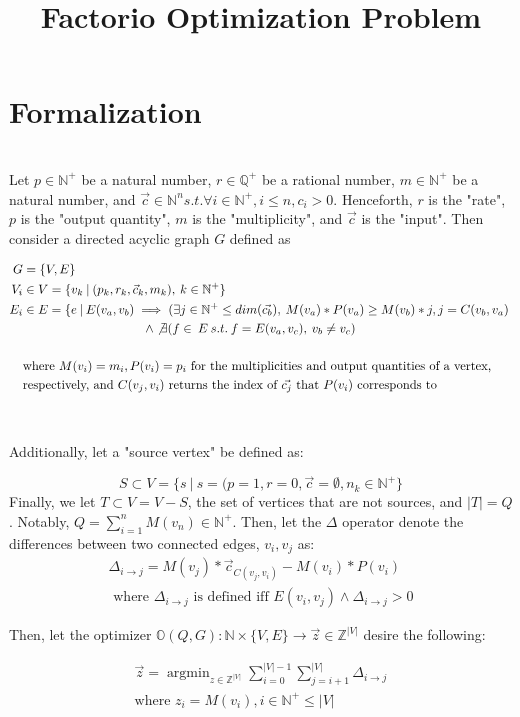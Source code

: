 \documentclass{article}
\title{Factorio Optimization Problem}
\DeclareMathOperator*{\argmin}{argmin}
\begin{document}
\maketitle

\section{Formalization}
\\
\indent Let $p \in \mathbb{N}^+$ be a natural number, $r \in \mathbb{Q}^+$ be a rational number, $m \in \mathbb{N}^+$ be a natural number, and $\vec{c} \in \mathbb{N}^n s.t. \forall i \in \mathbb{N}^+, i \leq n, c_i > 0 $. Henceforth, $r$ is the "rate", $p$ is the "output quantity", $m$ is the "multiplicity", and $\vec{c}$ is the "input". Then consider a directed acyclic graph $G$ defined as

\begin{align*}
G &=  \{V, E\}\\
 V_i &\in V = \{v_k \: | \: (p_k, r_k, \vec{c}_k, m_k), \: k \in \mathbb{N}^+\}\\
 E_i &\in E = \{e \: | \: E(v_a, v_b) \implies (\exists j \in \mathbb{N}^+ \leq dim(\vec{c_b}),\:  M(v_a)*P(v_a) \geq M(v_b) * j, j = C(v_b, v_a)\: \\
 & \hspace{1.355in}\land \not \exists (f \in \:E \: s.t.\: f = E(v_a, v_c), \: v_b \neq v_c)\\
 & \hspace{1.355in}\\
 &\text{where } M(v_i) = m_i, P(v_i) = p_i \text{ for the multiplicities and output quantities of a vertex,}\\
 & \text{respectively, and } C(v_j, v_i) \text{ returns the index of } \vec{c_j} \text{ that } P(v_i) \text{ corresponds to}
\end{align*}

\\\medskip

Additionally, let a "source vertex" be defined as:

\[
S \subset V = \{s \: | \: s = (p=1, r = 0, \vec{c} = \emptyset, n_k \in \mathbb{N}^+\}
\]
\medskip
Finally, we let $T \subset V = V - S$, the set of vertices that are not sources, and $|T| = Q$. Notably, $Q = \sum\limits_{i=1}^n M(v_n) \in \mathbb{N}^+$. Then, let the $\Delta$ operator denote the differences between two connected edges, $v_i, v_j$ as:
\begin{align*}
\Delta_{i\rightarrow j} = M(v_j)*\vec{c}_{C(v_j, v_i)} - M(v_i)*P(v_i) \\
\text{ where } \Delta_{i \rightarrow j} \text{ is defined iff } E(v_i, v_j) \land \Delta_{i \rightarrow j} > 0
\end{align*}

Then, let the optimizer $\mathbb{O}(Q, G): \mathbb{N} \times \{ V, E\} \rightarrow \vec{z} \in \mathbb{Z}^{|V|}$ desire the following:

\begin{align*}
    \vec{z} = \argmin_{z \in \mathbb{Z}^{|V|}} \sum\limits_{i = 0}^{|V|-1} \sum\limits_{j=i+1}^{|V|} \Delta_{i \rightarrow j}\\
    \text{where } z_i = M(v_i), i \in \mathbb{N}^+ \leq |V|
\end{align*}
\end{document}
